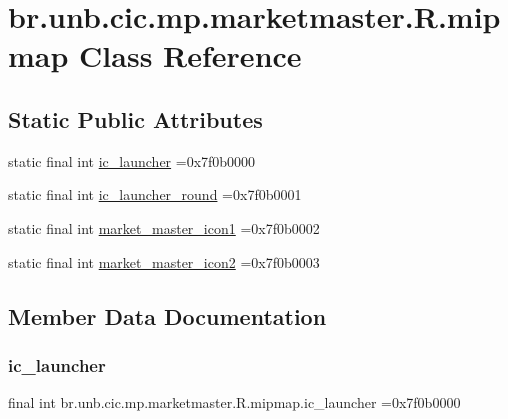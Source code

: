 \hypertarget{classbr_1_1unb_1_1cic_1_1mp_1_1marketmaster_1_1R_1_1mipmap}{}\section{br.\+unb.\+cic.\+mp.\+marketmaster.\+R.\+mipmap Class Reference}
\label{classbr_1_1unb_1_1cic_1_1mp_1_1marketmaster_1_1R_1_1mipmap}
\subsection*{Static Public Attributes}
\begin{DoxyCompactItemize}
\item 
static final int \mbox{\hyperlink{classbr_1_1unb_1_1cic_1_1mp_1_1marketmaster_1_1R_1_1mipmap_a30757193371fc368e9d1c39d0032777e}{ic\+\_\+launcher}} =0x7f0b0000
\item 
static final int \mbox{\hyperlink{classbr_1_1unb_1_1cic_1_1mp_1_1marketmaster_1_1R_1_1mipmap_a14a0dd1140758ebd8c68a11bb5e799ef}{ic\+\_\+launcher\+\_\+round}} =0x7f0b0001
\item 
static final int \mbox{\hyperlink{classbr_1_1unb_1_1cic_1_1mp_1_1marketmaster_1_1R_1_1mipmap_a8b46d1a37e0df22384241b1dbf3f7e8b}{market\+\_\+master\+\_\+icon1}} =0x7f0b0002
\item 
static final int \mbox{\hyperlink{classbr_1_1unb_1_1cic_1_1mp_1_1marketmaster_1_1R_1_1mipmap_a7493476a92d8ac1d744a69e44cad8d02}{market\+\_\+master\+\_\+icon2}} =0x7f0b0003
\end{DoxyCompactItemize}


\subsection{Member Data Documentation}
\mbox{\label{classbr_1_1unb_1_1cic_1_1mp_1_1marketmaster_1_1R_1_1mipmap_a30757193371fc368e9d1c39d0032777e}} 
\subsubsection{\texorpdfstring{ic\+\_\+launcher}{ic\_launcher}}
{\footnotesize\ttfamily final int br.\+unb.\+cic.\+mp.\+marketmaster.\+R.\+mipmap.\+ic\+\_\+launcher =0x7f0b0000\hspace{0.3cm}{\ttfamily [static]}}

